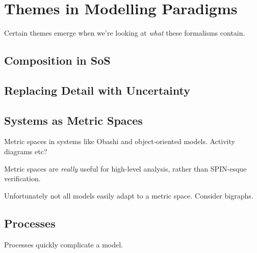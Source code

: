 \section{Themes in Modelling Paradigms}
Certain themes emerge when we're looking at \emph{what} these formalisms contain.


\subsection{Composition in SoS}


\subsection{Replacing Detail with Uncertainty}


\subsection{Systems as Metric Spaces}
Metric spaces in systems like Obashi and object-oriented models. Activity diagrams etc?
\par

Metric spaces are \emph{really} useful for high-level analysis, rather than SPIN-esque verification.
\par

Unfortunately not all models easily adapt to a metric space. Consider bigraphs.
\par

\subsection{Processes}
Processes quickly complicate a model.


